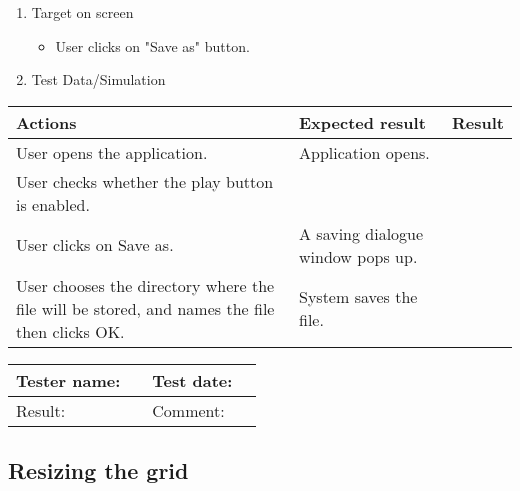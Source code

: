 \begin{enumerate}
	\item Target on screen
	\begin{itemize}
		\item User clicks on "Save as" button.
	\end{itemize}
	\item Test Data/Simulation
\end{enumerate}
	\begin{tabularx}{\textwidth}{|X|X|p{2.5cm}|}\hline
		Actions & Expected result & Result \\\hline
		User opens the application.& Application opens. &  \pass \\\hline
		User checks whether the play button is enabled. & &  \pass \\\hline
		User clicks on Save as. & A saving dialogue window pops up. & \pass \\\hline
		User chooses the directory where the file will be stored, and names the file then clicks OK. & System saves the file. & \pass \\\hline 
	\end{tabularx}

\begin{tabularx}{\textwidth}{|p{3cm}X|p{3cm}X|}\hline
	Tester name: &  & Test date: & \\\hline
	Result: &  \pass & Comment: & \\\hline
\end{tabularx}

\newpage
\subsection{Resizing the grid}

